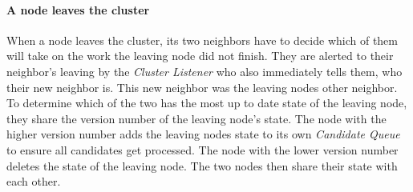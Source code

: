 \paragraph{A node leaves the cluster}
When a node leaves the cluster, its two neighbors have to decide which of them will take on the work the leaving node did not finish.
They are alerted to their neighbor's leaving by the \emph{Cluster Listener} who also immediately tells them, who their new neighbor is.
This new neighbor was the leaving nodes other neighbor.
To determine which of the two has the most up to date state of the leaving node, they share the version number of the leaving node's state. 
The node with the higher version number adds the leaving nodes state to its own \emph{Candidate Queue} to ensure all candidates get processed. 
The node with the lower version number deletes the state of the leaving node.
The two nodes then share their state with each other. 